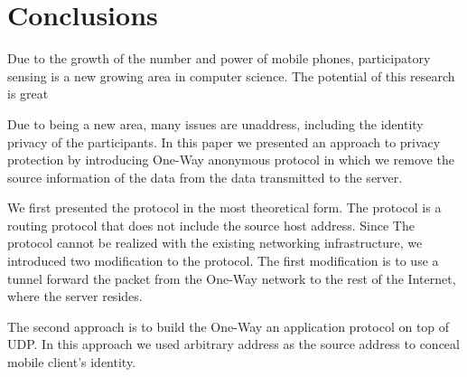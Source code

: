 \section{Conclusions}\label{sec-conc}

Due to the growth of the number and power of mobile phones, participatory
sensing is a new growing area in computer science. The potential of this
research is great

Due to being a new area, many issues are unaddress, including the identity
privacy of the participants. In this paper we presented an approach to privacy
protection by introducing One-Way anonymous protocol in which we remove
the source information of the data from the data transmitted to the server.

We first presented the protocol in the most theoretical form. The protocol
is a routing protocol that does not include the source host address. Since
The protocol cannot be realized with the existing networking infrastructure,
we introduced two modification to the protocol. The first modification is
to use a tunnel forward the packet from the One-Way network to the rest of
the Internet, where the server resides.

The second approach is to build the One-Way an application protocol on top
of UDP. In this approach we used arbitrary address as the source address to
conceal mobile client's identity. 